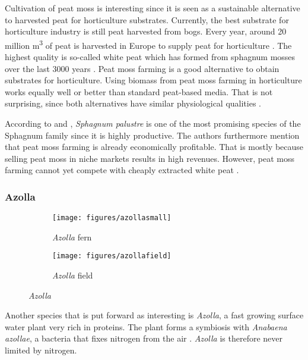 \documentclass[12pt,a4paper,titlepage]{article}
\begin{document}
Cultivation of peat moss is interesting since it is seen as a sustainable alternative to harvested peat for horticulture substrates. Currently, the best substrate for horticulture industry is still peat harvested from bogs. Every year, around 20 million m\textsuperscript{3} of peat is harvested in Europe to supply peat for horticulture \citep{altmann2008socio}. The highest quality is so-called white peat which has formed from sphagnum mosses over the last 3000 years \citep{gaudig2014sphagnum}. Peat moss farming is a good alternative to obtain substrates for horticulture. Using biomass from peat moss farming in horticulture works equally well or better than standard peat-based media. That is not surprising, since both alternatives have similar physiological qualities \citep{gaudig2014sphagnum}. 

According to \citet{gaudig2014sphagnum} and \citet{wichtmann2016paludiculture}, \textit{Sphagnum palustre} is one of the most promising species of the Sphagnum family since it is highly productive. The authors furthermore mention that peat moss farming is already economically profitable. That is mostly because selling peat moss in niche markets results in high revenues. However, peat moss farming cannot yet compete with cheaply extracted white peat \citep{gaudig2014sphagnum}.


\subsubsection{Azolla}

\begin{figure}
    \centering
    \begin{subfigure}[a]{0.3\textwidth}
    	\texttt{[image: figures/azollasmall]} 
    	\caption{ \textit{Azolla} fern}
    	\label{fig:azollasmall}
    \end{subfigure}	
    \quad
    \begin{subfigure}[a]{0.3\textwidth}
    	\texttt{[image: figures/azollafield]} 
    	\caption{ \textit{Azolla} field}
    	\label{fig:azollafield}
    \end{subfigure}	
    \caption{ \textit{Azolla} \citep{wagner1997azolla}}
    \label{fig:azolla}
\end{figure}

Another species that is put forward as interesting is \textit{Azolla}, a fast growing surface water plant very rich in proteins. The plant forms a symbiosis with \textit{Anabaena azollae}, a bacteria that fixes nitrogen from the air \citep{wagner1997azolla}. \textit{Azolla} is therefore never limited by nitrogen. 
\end{document}
